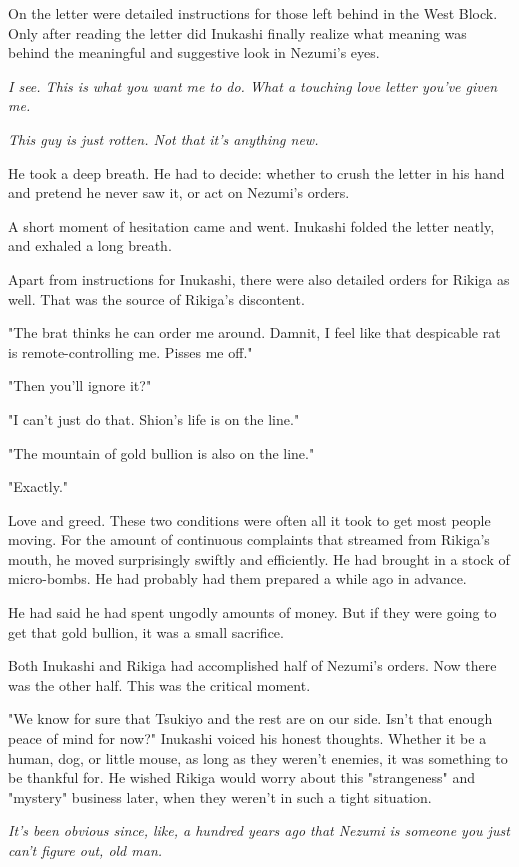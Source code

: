 On the letter were detailed instructions for those left behind in the
West Block. Only after reading the letter did Inukashi finally realize
what meaning was behind the meaningful and suggestive look in Nezumi's
eyes.

\emph{I see. This is what you want me to do. What a touching love letter
	you've given me.}

\emph{This guy is just rotten. Not that it's anything new.}

He took a deep breath. He had to decide: whether to crush the letter in
his hand and pretend he never saw it, or act on Nezumi's orders.

A short moment of hesitation came and went. Inukashi folded the letter
neatly, and exhaled a long breath.

Apart from instructions for Inukashi, there were also detailed orders
for Rikiga as well. That was the source of Rikiga's discontent.

"The brat thinks he can order me around. Damnit, I feel like that
despicable rat is remote-controlling me. Pisses me off."

"Then you'll ignore it?"

"I can't just do that. Shion's life is on the line."

"The mountain of gold bullion is also on the line."

"Exactly."

Love and greed. These two conditions were often all it took to get most
people moving. For the amount of continuous complaints that streamed
from Rikiga's mouth, he moved surprisingly swiftly and efficiently. He
had brought in a stock of micro-bombs. He had probably had them prepared
a while ago in advance.

He had said he had spent ungodly amounts of money. But if they were
going to get that gold bullion, it was a small sacrifice.

Both Inukashi and Rikiga had accomplished half of Nezumi's orders. Now
there was the other half. This was the critical moment.

"We know for sure that Tsukiyo and the rest are on our side. Isn't that
enough peace of mind for now?" Inukashi voiced his honest thoughts.
Whether it be a human, dog, or little mouse, as long as they weren't
enemies, it was something to be thankful for. He wished Rikiga would
worry about this "strangeness" and "mystery" business later, when they
weren't in such a tight situation.

\emph{It's been obvious since, like, a hundred years ago that Nezumi is
	someone you just can't figure out, old man.}


